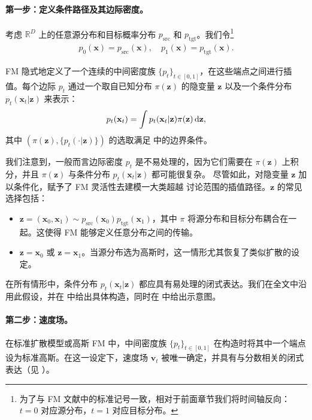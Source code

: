 \paragraph{第一步：定义条件路径及其边际密度。}
考虑 $\mathbb{R}^D$ 上的任意源分布和目标概率分布 $ p_{\mathrm{src}} $ 和 $ p_{\mathrm{tgt}} $。我们令\footnote{为了与 FM 文献中的标准记号一致，相对于前面章节我们将时间轴反向：$t=0$ 对应源分布，$t=1$ 对应目标分布。}
\begin{align}\label{eq:marginal-endpoint}
    p_0(\mathbf{x}) = p_{\mathrm{src}}(\mathbf{x}), \quad p_1(\mathbf{x}) = p_{\mathrm{tgt}}(\mathbf{x}).
\end{align}

FM 隐式地定义了一个连续的中间密度族 $\{ p_t \}_{t \in [0,1]}$，在这些端点之间进行插值。每个边际 $ p_t $ 通过一个取自已知分布 $\pi(\mathbf{z})$ 的隐变量 $\mathbf{z}$ 以及一个条件分布 $p_t(\mathbf{x}_t | \mathbf{z})$ 来表示：
\begin{equation}\label{eq:p_t}
    p_t(\mathbf{x}_t) = \int p_t(\mathbf{x}_t | \mathbf{z}) \pi(\mathbf{z}) \mathop{}\!\mathrm{d} \mathbf{z},
\end{equation}
其中 $(\pi(\mathbf{z}), \{p_t(\cdot|\mathbf{z})\})$ 的选取满足  中的边界条件。

我们注意到，一般而言边际密度 $p_t$ 是不易处理的，因为它们需要在 $\pi(\mathbf{z})$ 上积分，并且 $\pi(\mathbf{z})$ 与条件分布 $p_t(\mathbf{x}_t|\mathbf{z})$ 都可能很复杂。
尽管如此，对隐变量 $\mathbf{z}$ 加以条件化，赋予了 FM 灵活性去建模一大类超越  讨论范围的插值路径。$\mathbf{z}$ 的常见选择包括：
\begin{itemize}
    \item {} $\mathbf{z} = (\mathbf{x}_0, \mathbf{x}_1) \sim p_{\text{src}}(\mathbf{x}_0) p_{\text{tgt}}(\mathbf{x}_1)$，其中 $\pi$ 将源分布和目标分布耦合在一起。这使得 FM 能够定义任意分布之间的传输。
    \item {} $\mathbf{z} = \mathbf{x}_0$ 或 $\mathbf{z} = \mathbf{x}_1$。当源分布选为高斯时，这一情形尤其恢复了类似扩散的设定。
\end{itemize}

在所有情形中，条件分布 $ p_t(\mathbf{x}_t|\mathbf{z}) $ 都应具有易处理的闭式表达。我们在全文中沿用此假设，并在  中给出具体构造，同时在  中给出示意图。


\paragraph{第二步：速度场。}
在标准扩散模型或高斯 FM 中，中间密度族 $\{p_t\}_{t \in [0,1]}$ 在构造时将其中一个端点设为标准高斯。在这一设定下，速度场 $\mathbf{v}_t$ 被唯一确定，并具有与分数相关的闭式表达（见 ）。

